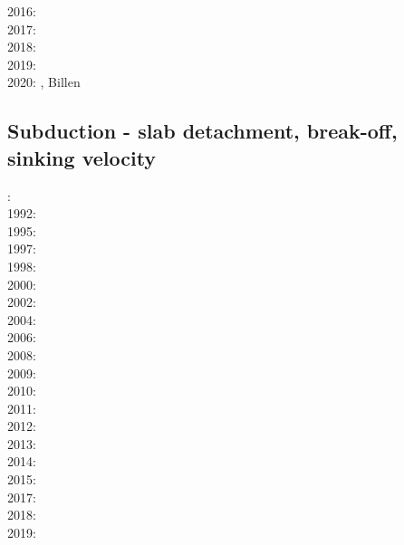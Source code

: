 {2016: \cite{tomy16}\cite{gukt16}\cite{robn16}\cite{mavm16}\cite{magc16}\cite{marl16}\cite{mesj16}
      \cite{jada16}\cite{jada16b}\cite{liku16}\cite{chss16}\\
2017: \cite{kicf17}\cite{sche17}\cite{pest17}\cite{vomc17}\cite{majf17}\cite{yabr17}\cite{shwl17}
      \cite{hobe17}\\
2018: \cite{yamz18}\cite{crli18}\cite{spcv18}\cite{chss18}\cite{yagz18}\cite{mazh18}\cite{pukp18}
      \cite{masg18}\cite{biar18}\\
2019: \cite{magn19}\cite{mavb19}\cite{scvm19}\cite{cakc19}\cite{samo19}\cite{sihf19}\cite{meag19}
      \cite{vaws19}\cite{bokg19}\cite{vawg19}\cite{cibi19}\cite{pust19}\\
2020: \cite{algg20}\cite{braf20}\cite{vamg20}\cite{dawl20}\cite{meag20}\cite{bedh20}\cite{heyg20}
      \cite{kicd20}\cite{mugu20}\cite{gatt20}\cite{pust20}, Billen \cite{bill20}
}

\subsection{Subduction - slab detachment, break-off, sinking velocity}


{\scriptsize
{}: \cite{futo85}\\
1992: \cite{wosp92}\\
1995: \cite{yowo95}\cite{voda95}\cite{davo95}\\
1997: \cite{wowo97}\\
1998: \cite{desw98}\cite{caws98}\\
2000: \cite{wosp00}\\
2002: \cite{bugw02}\\
2004: \cite{geym04}\\
2006: \cite{fabm06}\\
2008: \cite{zlfd08}\\
2009: \cite{anbi09}\cite{bubi09}\cite{vasv09}\\
2010: \cite{bubi10}\cite{bagc10}\cite{hagr10}\\
2011: \cite{dugm11}\cite{vaal11}\cite{schm11}\\
2012: \cite{dugk12}\cite{dusg12}\\
2013: \cite{care13}\cite{mafv13}\cite{ghbu13}\cite{duge13}\cite{lixg13}\\
2014: \cite{dugs14}\cite{besr14}\cite{vosd14}\cite{butm14}\\
2015: \cite{vosc15}\cite{fohk15}\\
2017: \cite{frbm17}\cite{maav17}\\
2018: \cite{garm18}\cite{bezb18}\\
2019: \cite{beml19}\cite{fegb19}
}


